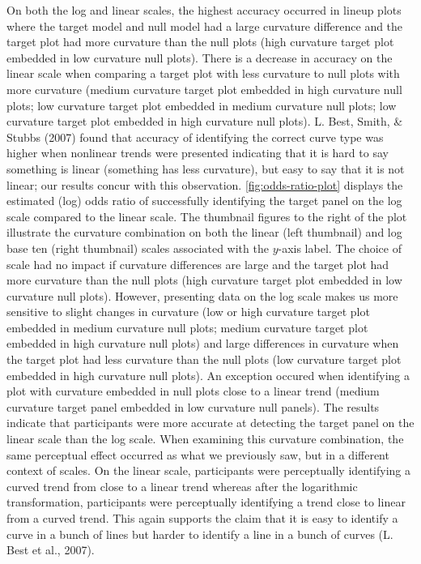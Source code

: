 \documentclass[print]{nuthesis}
\begin{document}
On both the log and linear scales, the highest accuracy occurred in lineup plots where the target model and null model had a large curvature difference and the target plot had more curvature than the null plots (high curvature target plot embedded in low curvature null plots).
There is a decrease in accuracy on the linear scale when comparing a target plot with less curvature to null plots with more curvature (medium curvature target plot embedded in high curvature null plots; low curvature target plot embedded in medium curvature null plots; low curvature target plot embedded in high curvature null plots).
L. Best, Smith, \& Stubbs (2007) found that accuracy of identifying the correct curve type was higher when nonlinear trends were presented indicating that it is hard to say something is linear (something has less curvature), but easy to say that it is not linear; our results concur with this observation.
\cref{fig:odds-ratio-plot} displays the estimated (log) odds ratio of successfully identifying the target panel on the log scale compared to the linear scale. The thumbnail figures to the right of the plot illustrate the curvature combination on both the linear (left thumbnail) and log base ten (right thumbnail) scales associated with the \(y\)-axis label.
The choice of scale had no impact if curvature differences are large and the target plot had more curvature than the null plots (high curvature target plot embedded in low curvature null plots).
However, presenting data on the log scale makes us more sensitive to slight changes in curvature (low or high curvature target plot embedded in medium curvature null plots; medium curvature target plot embedded in high curvature null plots) and large differences in curvature when the target plot had less curvature than the null plots (low curvature target plot embedded in high curvature null plots).
An exception occured when identifying a plot with curvature embedded in null plots close to a linear trend (medium curvature target panel embedded in low curvature null panels).
The results indicate that participants were more accurate at detecting the target panel on the linear scale than the log scale.
When examining this curvature combination, the same perceptual effect occurred as what we previously saw, but in a different context of scales.
On the linear scale, participants were perceptually identifying a curved trend from close to a linear trend whereas after the logarithmic transformation, participants were perceptually identifying a trend close to linear from a curved trend.
This again supports the claim that it is easy to identify a curve in a bunch of lines but harder to identify a line in a bunch of curves (L. Best et al., 2007).
\end{document}
